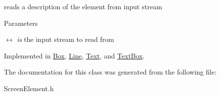 reads a description of the element from input stream 
\begin{DoxyParams}{Parameters}
\item[\mbox{$\leftrightarrow$} {\em is}]the input stream to read from \end{DoxyParams}


Implemented in \hyperlink{classBox_ac0ea633a10bf980901766b7aaefdb912}{Box}, \hyperlink{classLine_a8ca52eabbd2ede5f52cf6c220a4c2f2c}{Line}, \hyperlink{classText_af326f364609eb7e286ad778accb29db3}{Text}, and \hyperlink{classTextBox_a3265df3298f92813667d1c70479f7f5c}{TextBox}.

The documentation for this class was generated from the following file:\begin{DoxyCompactItemize}
\item 
ScreenElement.h\end{DoxyCompactItemize}
